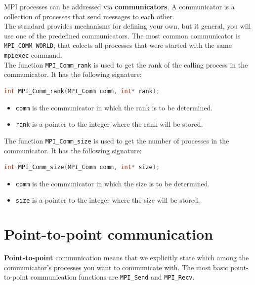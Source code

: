 MPI processes can be addressed via \textbf{communicators}. A communicator is a collection of
processes that send messages to each other.\\

The standard provides mechanisms for defining your own, but it general, you will use one of
the predefined communicators. The most common communicator is \texttt{MPI\_COMM\_WORLD},
that colects all processes that were started with the same \texttt{mpiexec} command.\\

The function \texttt{MPI\_Comm\_rank} is used to get the rank of the calling process in the
communicator. It has the following signature:

\begin{lstlisting}[language=C++]
int MPI_Comm_rank(MPI_Comm comm, int* rank);
\end{lstlisting}

\begin{itemize}
    \item \texttt{comm} is the communicator in which the rank is to be determined.
    \item \texttt{rank} is a pointer to the integer where the rank will be stored.
\end{itemize}

The function \texttt{MPI\_Comm\_size} is used to get the number of processes in the communicator.
It has the following signature:

\begin{lstlisting}[language=C++]
int MPI_Comm_size(MPI_Comm comm, int* size);
\end{lstlisting}

\begin{itemize}
    \item \texttt{comm} is the communicator in which the size is to be determined.
    \item \texttt{size} is a pointer to the integer where the size will be stored.
\end{itemize}

\section{Point-to-point communication}

\textbf{Point-to-point} communication means that we explicitly state which among the 
communicator's processes you want to communicate with. The most basic point-to-point
communication functions are \texttt{MPI\_Send} and \texttt{MPI\_Recv}.\\

